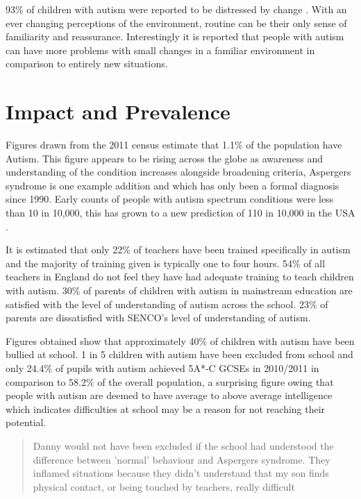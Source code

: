 \documentclass[11pt]{report}
\begin{document}
93\% of children with autism were reported to be distressed by change \cite{fears}. With an ever changing perceptions of the environment, routine can be their only sense of familiarity and reassurance. Interestingly it is reported that people with autism can have more problems with small changes in a familiar environment in comparison to entirely new situations\cite{bayes}.  


\section{Impact and Prevalence}
Figures drawn from the 2011 census estimate that 1.1\% of the population have Autism\cite{nas}. This figure appears to be rising across the globe as awareness and understanding of the condition increases alongside broadening criteria\cite{increasingprevalence}, Aspergers syndrome is one example addition and which has only been a formal diagnosis since 1990. Early counts of people with autism spectrum conditions were less than 10 in 10,000, this has grown to a new prediction of 110 in 10,000 in the USA \cite{increasingprevalence}.

It is estimated that only 22\% of teachers have been trained specifically in autism and the majority of training given is typically one to four hours. 54\% of all teachers in England do not feel they have had adequate training to teach children with autism.\cite{statsandfacts} 30\% of parents of children with autism in mainstream education are satisfied with the level of understanding of autism across the school\cite{nasschool}. 23\% of parents are dissatisfied with SENCO's level of understanding of autism. 

Figures obtained show that approximately 40\% of children with autism have been bullied at school. 1 in 5 children with autism have been excluded from school \cite{nasschool} and only 24.4\% of pupils with autism achieved 5A*-C GCSEs in 2010/2011 in comparison to 58.2\% of the overall population\cite{statsandfacts}, a surprising figure owing that people with autism are deemed to have average to above average intelligence which indicates difficulties at school may be a reason for not reaching their potential.

\begin{quote}
Danny would not have been excluded if the school had understood the difference between 'normal' behaviour and Aspergers syndrome. They inflamed situations because they didn't understand that my son finds physical contact, or being touched by teachers, really difficult \cite{nasschool}
\end{quote}
\end{document}
